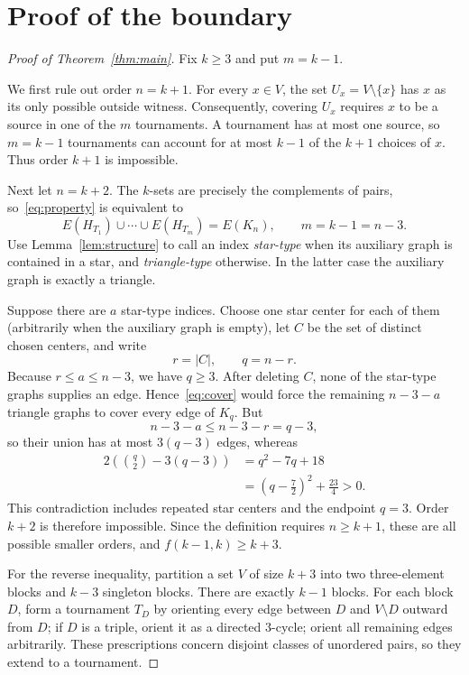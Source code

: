 \documentclass[11pt]{article}
\begin{document}
\section{Proof of the boundary}

\begin{proof}[Proof of Theorem~\ref{thm:main}]
Fix $k\geq3$ and put $m=k-1$.

We first rule out order $n=k+1$.  For every $x\in V$, the set
$U_x=V\setminus\{x\}$ has $x$ as its only possible outside witness.
Consequently, covering $U_x$ requires $x$ to be a source in one of the
$m$ tournaments.  A tournament has at most one source, so $m=k-1$
tournaments can account for at most $k-1$ of the $k+1$ choices of $x$.
Thus order $k+1$ is impossible.

Next let $n=k+2$.  The $k$-sets are precisely the complements of pairs,
so~\eqref{eq:property} is equivalent to
\begin{equation}\label{eq:cover}
  E(H_{T_1})\cup\cdots\cup E(H_{T_m})=E(K_n),
  \qquad m=k-1=n-3.
\end{equation}
Use Lemma~\ref{lem:structure} to call an index \emph{star-type} when its
auxiliary graph is contained in a star, and \emph{triangle-type}
otherwise.  In the latter case the auxiliary graph is exactly a triangle.

Suppose there are $a$ star-type indices.  Choose one star center for each
of them (arbitrarily when the auxiliary graph is empty), let $C$ be the
set of distinct chosen centers, and write
\[
    r=|C|,\qquad q=n-r.
\]
Because $r\leq a\leq n-3$, we have $q\geq3$.  After deleting $C$, none of
the star-type graphs supplies an edge.  Hence~\eqref{eq:cover} would force
the remaining $n-3-a$ triangle graphs to cover every edge of $K_q$.  But
\[
 n-3-a\leq n-3-r=q-3,
\]
so their union has at most $3(q-3)$ edges, whereas
\begin{align*}
  2\left(\binom q2-3(q-3)\right)
    &=q^2-7q+18\\
    &=\left(q-\frac72\right)^2+\frac{23}{4}>0.
\end{align*}
This contradiction includes repeated star centers and the endpoint
$q=3$.  Order $k+2$ is therefore impossible.  Since the definition
requires $n\geq k+1$, these are all possible smaller orders, and
$f(k-1,k)\geq k+3$.

For the reverse inequality, partition a set $V$ of size $k+3$ into two
three-element blocks and $k-3$ singleton blocks.  There are exactly
$k-1$ blocks.  For each block $D$, form a tournament $T_D$ by orienting
every edge between $D$ and $V\setminus D$ outward from $D$; if $D$ is a
triple, orient it as a directed $3$-cycle; orient all remaining edges
arbitrarily.  These prescriptions concern disjoint classes of unordered
pairs, so they extend to a tournament.


\end{proof}
\end{document}
